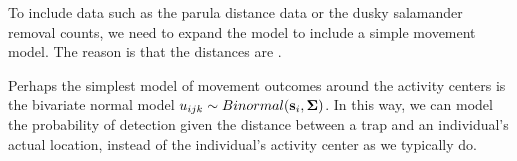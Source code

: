 To include data such as the parula distance data or the dusky
salamander removal counts, we need to expand the model to include a
simple movement model. The reason is that the distances are .

Perhaps the simplest model of movement outcomes around the activity
centers is the bivariate normal model
$u_{ijk} \sim Binormal({\bf s}_i, {\bf \Sigma})$.
In this way, we can model the probability of detection given the
distance between a trap and an individual's actual location, instead
of the individual's activity center as we typically do.




